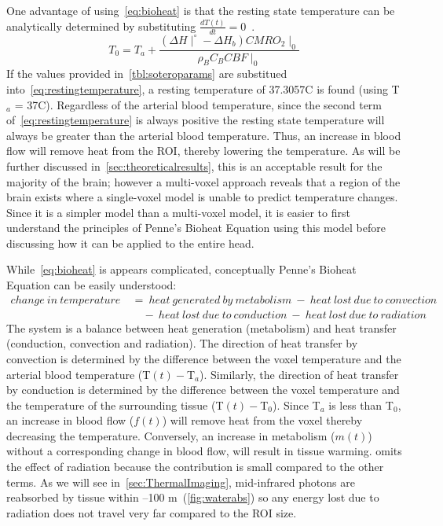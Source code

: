     One advantage of using~\cref{eq:bioheat} is that the resting state temperature can be analytically determined by substituting $\frac{dT(t)}{dt} = 0$~\citep{sotero2011}.
    \begin{equation}
      \label{eq:restingtemperature}
      T_{0} = T_{a} + \frac{(\Delta H \mid^{\circ} - \Delta H_{b}) CMRO_{2}\mid_{0}}{\rho_{B} C_{B} CBF\mid_{0}}
    \end{equation}
    If the values provided in~\cref{tbl:soteroparams} are substitued into~\cref{eq:restingtemperature}, a resting temperature of 37.3057\degree C is found (using T$_a$ = 37\degree C).  Regardless of the arterial blood temperature, since the second term of~\cref{eq:restingtemperature} is always positive the resting state temperature will always be greater than the arterial blood temperature. Thus, an increase in blood flow will remove heat from the ROI, thereby lowering the temperature. As will be further discussed in~\cref{sec:theoreticalresults}, this is an acceptable result for the majority of the brain; however a multi-voxel approach reveals that a region of the brain exists where a single-voxel model is unable to predict temperature changes.  Since it is a simpler model than a multi-voxel model, it is easier to first understand the principles of Penne's Bioheat Equation using this model before discussing how it can be applied to the entire head. 
    
    While~\cref{eq:bioheat} is appears complicated, conceptually Penne's Bioheat Equation can be easily understood:
    \begin{align}    
      \label{eq:soteroexplaiend}
      change\ in\ temperature\ &=\ heat\ generated\ by\ metabolism\ -\ heat\ lost\ due\ to\ convection\ \nonumber\\
      &\quad {} -\ heat\ lost\ due\ to\ conduction\ -\ heat\ lost\ due\ to\ radiation\
    \end{align}
    The system is a balance between heat generation (metabolism) and heat transfer (conduction, convection and radiation).  The direction of heat transfer by convection is determined by the difference between the voxel temperature and the arterial blood temperature (T$(t) - $T$_a$).  Similarly, the direction of heat transfer by conduction is determined by the difference between the voxel temperature and the temperature of the surrounding tissue (T$(t) - $T$_0$).  Since T$_a$ is less than T$_0$, an increase in blood flow ($f(t)$) will remove heat from the voxel thereby decreasing the temperature.  Conversely, an increase in metabolism ($m(t)$) without a corresponding change in blood flow, will result in tissue warming.   omits the effect of radiation because the contribution is small compared to the other terms.  As we will see in~\cref{sec:ThermalImaging}, mid-infrared photons are reabsorbed by tissue within --100 \textmu m~(\cref{fig:waterabs}) so any energy lost due to radiation does not travel very far compared to the ROI size.
    
